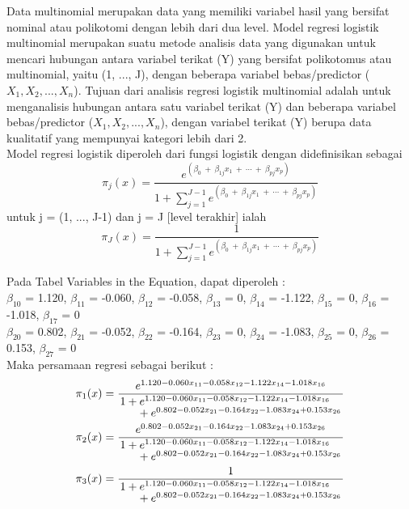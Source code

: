 \begin{sloppypar}
Data multinomial merupakan data yang memiliki variabel hasil yang bersifat nominal atau polikotomi dengan lebih dari dua level. Model regresi logistik multinomial merupakan suatu metode analisis data yang digunakan untuk mencari hubungan antara variabel terikat (Y) yang bersifat polikotomus atau multinomial, yaitu (1, ..., J), dengan beberapa variabel bebas/predictor ($X_1, X_2, ..., X_n$). 
Tujuan dari analisis regresi logistik multinomial adalah untuk menganalisis hubungan antara satu variabel terikat (Y) dan beberapa variabel bebas/predictor ($X_1, X_2, ..., X_n$), dengan variabel terikat (Y) berupa data kualitatif yang mempunyai kategori lebih dari 2.
\\ Model regresi logistik diperoleh dari fungsi logistik dengan didefinisikan sebagai $$\pi_j(x) = \frac{e^{(\beta_0\ +\ \beta_{1j} x_1\ +\ \cdots\ +\ \beta_{pj} x_p)}}{1 + \sum_{j=1}^{J-1} e^{(\beta_0\ +\ \beta_{1j} x_1\ +\ \cdots\ +\ \beta_{pj} x_p)}}$$
untuk j = (1, ..., J-1) dan j = J [level terakhir] ialah $$\pi_J(x) = \frac{1}{1 + \sum_{j=1}^{J-1} e^{(\beta_0\ +\ \beta_{1j} x_1\ +\ \cdots\ +\ \beta_{pj} x_p)}}$$
\end{sloppypar}
\begin{test}{
    Pada Tabel Variables in the Equation, dapat diperoleh : \\
    $\beta_{10}$ = 1.120, $\beta_{11}$ = -0.060, $\beta_{12}$ = -0.058, $\beta_{13}$ = 0, $\beta_{14}$ = -1.122, $\beta_{15}$ = 0, $\beta_{16}$ = -1.018, $\beta_{17}$ = 0 \\
    $\beta_{20}$ = 0.802, $\beta_{21}$ = -0.052, $\beta_{22}$ = -0.164, $\beta_{23}$ = 0, $\beta_{24}$ = -1.083, $\beta_{25}$ = 0, $\beta_{26}$ = 0.153, $\beta_{27}$ = 0 \\
    Maka persamaan regresi sebagai berikut : \\
    \begin{equation*}
    \begin{aligned}
        \pi_1(x) &= \frac{e^{1.120 - 0.060 x_{11} - 0.058 x_{12} - 1.122 x_{14} - 1.018 x_{16}}}{\splitfrac{1 + e^{1.120 - 0.060 x_{11} - 0.058 x_{12} - 1.122 x_{14} - 1.018 x_{16}}}{+ e^{0.802 - 0.052 x_{21} - 0.164 x_{22} - 1.083 x_{24} + 0.153 x_{26}}}} \\
        \pi_2(x) &= \frac{e^{0.802 - 0.052 x_{21} - 0.164 x_{22} - 1.083 x_{24} + 0.153 x_{26}}}{\splitfrac{1 + e^{1.120 - 0.060 x_{11} - 0.058 x_{12} - 1.122 x_{14} - 1.018 x_{16}}}{+ e^{0.802 - 0.052 x_{21} - 0.164 x_{22} - 1.083 x_{24} + 0.153 x_{26}}}} \\
        \pi_3(x) &= \frac{1}{\splitfrac{1 + e^{1.120 - 0.060 x_{11} - 0.058 x_{12} - 1.122 x_{14} - 1.018 x_{16}}}{+ e^{0.802 - 0.052 x_{21} - 0.164 x_{22} - 1.083 x_{24} + 0.153 x_{26}}}}
    \end{aligned}
    \end{equation*}
}
\end{test}


